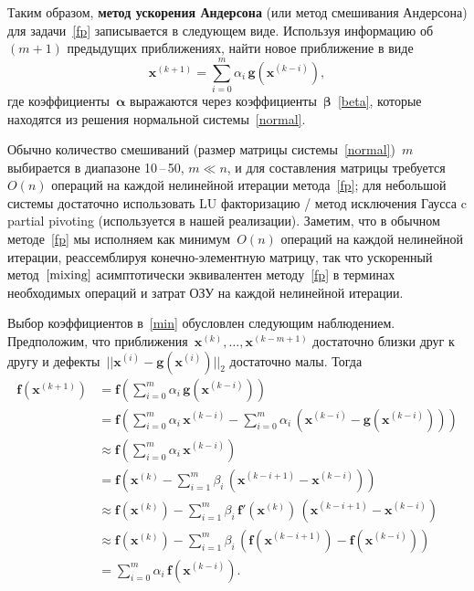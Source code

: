 \documentclass[a4paper, 14pt]{extarticle}
\newcommand{\vect}[1]{\boldsymbol{\mathbf{#1}}}
\begin{document}
	Таким образом, \textbf{метод ускорения Андерсона} (или метод смешивания Андерсона) для задачи~\eqref{fp} записывается в следующем виде. Используя информацию об ${(m + 1)}$ предыдущих приближениях, найти новое приближение в виде
	$$
		\vect x^{(k+1)} = \sum_{i=0}^m \alpha_i\,\vect g(\vect x^{(k-i)}),
	$$  
	где коэффициенты~$\vect\alpha$ выражаются через коэффициенты~$\vect\beta$~\eqref{beta}, которые находятся из решения нормальной системы~\eqref{normal}.
	
	Обычно количество смешиваний (размер матрицы системы~\eqref{normal})~$m$ выбирается в диапазоне 10\,--\,50, $m \ll n$, и для составления матрицы требуется~$O(n)$ операций на каждой нелинейной итерации метода~\eqref{fp}; для небольшой системы достаточно использовать LU факторизацию / метод исключения Гаусса c partial pivoting (используется в нашей реализации)\footnotemark{}. Заметим, что в обычном методе~\eqref{fp} мы исполняем как минимум~$O(n)$ операций на каждой нелинейной итерации, реассемблируя конечно-элементную матрицу, так что ускоренный метод~$\eqref{mixing}$ асимптотически эквивалентен методу~\eqref{fp} в терминах необходимых операций и затрат ОЗУ на каждой нелинейной итерации. 
	
	
	Выбор коэффициентов в~\eqref{min} обусловлен следующим наблюдением. Предположим, что приближения~$\vect x^{(k)}, \dots, \vect x^{(k-m+1)}$ достаточно близки друг к другу и дефекты~$|| \vect x^{(i)} - \vect g(\vect x^{(i)}) ||_2$ достаточно малы. Тогда
	\begin{equation}\label{linres}
		\begin{aligned}
			\vect f(\vect x^{(k+1)}) 
			&= \vect f\left( \sum_{i=0}^m \alpha_i\,\vect g(\vect x^{(k-i)}) \right) \\
			&= \vect f\left( \sum_{i=0}^m \alpha_i\,\vect x^{(k-i)} - \sum_{i=0}^m \alpha_i\,\left( \vect x^{(k-i)} - \vect g(\vect x^{(k-i)}) \right) \right) \\
			&\approx \vect f\left( \sum_{i=0}^m \alpha_i\,\vect x^{(k-i)} \right) \\
			&= \vect f\left( \vect x^{(k)} - \sum_{i=1}^m \beta_i\,\left( \vect x^{(k-i+1)} - \vect x^{(k-i)} \right) \right) \\
			&\approx \vect f(\vect x^{(k)}) - \sum_{i=1}^m \beta_i\,\vect f'(\vect x^{(k)})\,\left( \vect x^{(k-i+1)} - \vect x^{(k-i)} \right) \\
			&\approx \vect f(\vect x^{(k)}) - \sum_{i=1}^m \beta_i\,\left( \vect f(\vect x^{(k-i+1)}) - \vect f(\vect x^{(k-i)}) \right) \\
			&=\sum_{i=0}^m \alpha_i\,\vect f(\vect x^{(k-i)}). 
		\end{aligned}
	\end{equation}
	
\end{document}
